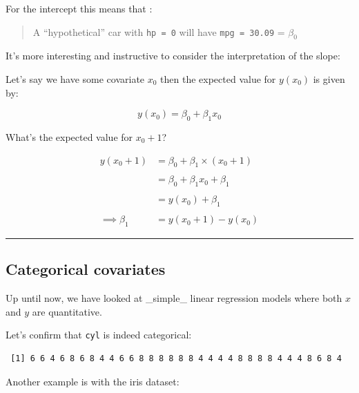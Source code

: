 \documentclass[
  letterpaper,
  DIV=11,
  numbers=noendperiod]{scrartcl}
\newenvironment{Shaded}{\begin{snugshade}}{\end{snugshade}}
\newcommand{\NormalTok}[1]{\textcolor[rgb]{0.00,0.23,0.31}{#1}}
\newcommand{\SpecialCharTok}[1]{\textcolor[rgb]{0.37,0.37,0.37}{#1}}
\begin{document}
For the intercept this means that :

\begin{quote}
A ``hypothetical'' car with \texttt{hp\ =\ 0} will have
\texttt{mpg\ =\ 30.09} = \(\beta_0\)
\end{quote}

It's more interesting and instructive to consider the interpretation of
the slope:

Let's say we have some covariate \(x_0\) then the expected value for
\(y(x_0)\) is given by:

\[
y(x_0) = \beta_0 + \beta_1 x_0
\]

What's the expected value for \(x_0 + 1\)?

\[
\begin{align}
y(x_0 + 1) &= \beta_0 + \beta_1 \times (x_0 + 1)\\ \\
&= \beta_0 + \beta_1 x_0 + \beta_1\\ \\
&= y(x_0) + \beta_1\\ \\
\implies \beta_1 &= y(x_0 + 1) - y(x_0)
\end{align}
\]

\begin{center}\rule{0.5\linewidth}{0.5pt}\end{center}

\hypertarget{categorical-covariates}{%
\subsection{Categorical covariates}\label{categorical-covariates}}

Up until now, we have looked at \_simple\_ linear regression models
where both \(x\) and \(y\) are quantitative.

Let's confirm that \texttt{cyl} is indeed categorical:

\begin{Shaded}
\end{Shaded}

\begin{verbatim}
 [1] 6 6 4 6 8 6 8 4 4 6 6 8 8 8 8 8 8 4 4 4 4 8 8 8 8 4 4 4 8 6 8 4
\end{verbatim}

Another example is with the iris dataset:
\end{document}
